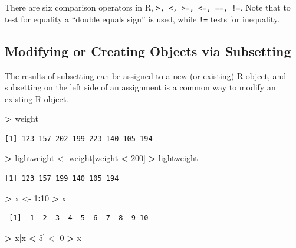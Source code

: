\documentclass[]{krantz}
\makeatletter
\newenvironment{Shaded}{\begin{snugshade}}{\end{snugshade}}
\newcommand{\DecValTok}[1]{\textcolor[rgb]{0.06,0.06,0.06}{#1}}
\newcommand{\StringTok}[1]{\textcolor[rgb]{0.5,0.5,0.5}{#1}}
\newcommand{\OperatorTok}[1]{\textcolor[rgb]{0.43,0.43,0.43}{\textbf{#1}}}
\newcommand{\NormalTok}[1]{#1}
\newenvironment{kframe}{%
\medskip{}
\setlength{\fboxsep}{.8em}
 \def\at@end@of@kframe{}%
 \ifinner\ifhmode%
  \def\at@end@of@kframe{\end{minipage}}%
  \begin{minipage}{\columnwidth}%
 \fi\fi%
 \def\FrameCommand##1{\hskip\@totalleftmargin \hskip-\fboxsep
 \colorbox{shadecolor}{##1}\hskip-\fboxsep
     \hskip-\linewidth \hskip-\@totalleftmargin \hskip\columnwidth}%
 \MakeFramed {\advance\hsize-\width
   \@totalleftmargin\z@ \linewidth\hsize
   \@setminipage}}%
 {\par\unskip\endMakeFramed%
 \at@end@of@kframe}
\renewenvironment{Shaded}{\begin{kframe}}{\end{kframe}}
\makeatother
\begin{document}
There are six comparison operators in R,
\texttt{\textgreater{},\ \textless{},\ \textgreater{}=,\ \textless{}=,\ ==,\ !=}.
Note that to test for equality a ``double equals sign'' is used, while
\texttt{!=} tests for inequality.

\subsection{Modifying or Creating Objects via
Subsetting}\label{modifying-or-creating-objects-via-subsetting}

The results of subsetting can be assigned to a new (or existing) R
object, and subsetting on the left side of an assignment is a common way
to modify an existing R object.

\begin{Shaded}
\begin{Highlighting}[]
\OperatorTok{>}\StringTok{ }\NormalTok{weight}
\end{Highlighting}
\end{Shaded}

\begin{verbatim}
[1] 123 157 202 199 223 140 105 194
\end{verbatim}

\begin{Shaded}
\begin{Highlighting}[]
\OperatorTok{>}\StringTok{ }\NormalTok{lightweight <-}\StringTok{ }\NormalTok{weight[weight }\OperatorTok{<}\StringTok{ }\DecValTok{200}\NormalTok{]}
\OperatorTok{>}\StringTok{ }\NormalTok{lightweight}
\end{Highlighting}
\end{Shaded}

\begin{verbatim}
[1] 123 157 199 140 105 194
\end{verbatim}

\begin{Shaded}
\begin{Highlighting}[]
\OperatorTok{>}\StringTok{ }\NormalTok{x <-}\StringTok{ }\DecValTok{1}\OperatorTok{:}\DecValTok{10}
\OperatorTok{>}\StringTok{ }\NormalTok{x}
\end{Highlighting}
\end{Shaded}

\begin{verbatim}
 [1]  1  2  3  4  5  6  7  8  9 10
\end{verbatim}

\begin{Shaded}
\begin{Highlighting}[]
\OperatorTok{>}\StringTok{ }\NormalTok{x[x }\OperatorTok{<}\StringTok{ }\DecValTok{5}\NormalTok{] <-}\StringTok{ }\DecValTok{0}
\OperatorTok{>}\StringTok{ }\NormalTok{x}
\end{Highlighting}
\end{Shaded}
\end{document}
